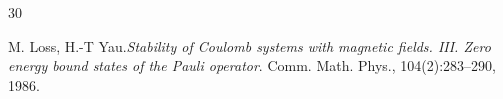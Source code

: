 \documentclass[11pt]{amsart}
\theoremstyle{plain}
\numberwithin{equation}{section}
\theoremstyle{plain}
\begin{document}
\begin{thebibliography}{30}













  M. Loss, H.-T Yau.{\it Stability of Coulomb systems with magnetic fields. III. Zero energy
bound states of the Pauli operator}. Comm. Math. Phys., 104(2):283–290, 1986.


\end{thebibliography}
\end{document}

